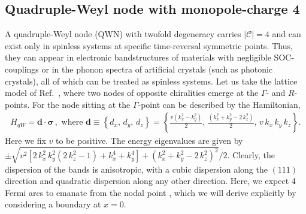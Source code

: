 \documentclass[aps,prb,onecolumn, footinbib, 10pt]{revtex4-2}
\begin{document}
\subsection{Quadruple-Weyl node with monopole-charge 4}


 
A quadruple-Weyl node (QWN) with twofold degeneracy carries $|\mathcal C| = 4 $ \cite{charge4-1, charge4-2, charge4-3, charge4-4} and can exist only in spinless systems at specific time-reversal symmetric points. Thus, they can appear in electronic bandstructures of materials with
negligible SOC-couplings or in the phonon spectra of artificial crystals (such as photonic crystals), all of which can be treated as spinless systems. Let us take the lattice model of Ref.~\cite{charge4-4}, where two nodes of opposite chiralities emerge at the $\Gamma$- and $R$-points. 
For the node sitting at the $\Gamma$-point can be described by the Hamiltonian,
\begin{align}
\label{eqhamqw}
H_{qW} = \boldsymbol{d} \cdot \boldsymbol{\sigma}  \,, \text{ where }
\boldsymbol{d} \equiv \left\{ d_x,\, d_y, \, d_z \right\}= \left\{\frac{ v \left(k_x^2-k_y^2\right)}{2}, \,\frac{\left(k_x^2+k_y^2-2 \,k_z^2\right)}{2} ,
\,v\, k_x\, k_y\, k_z\right\} .
\end{align}
Here we fix $v$ to be positive. The energy eigenvalues are given by $\pm \sqrt{ v^2 \left [
2 \,k_x^2 \,k_y^2 \left(2 \,k_z^2-1\right)+k_x^4+k_y^4\right ]
+\left(k_x^2+k_y^2-2\, k_z^2\right)^2 } / 2$. Clearly, the dispersion of the bands is anisotropic, with a cubic dispersion along the $(111)$ direction and quadratic dispersion along any other direction. Here, we expect 4 Fermi arcs to emanate from the nodal point \cite{quad-weyl-arc}, which we will derive explicitly by considering a boundary at $x = 0$.
\end{document}
